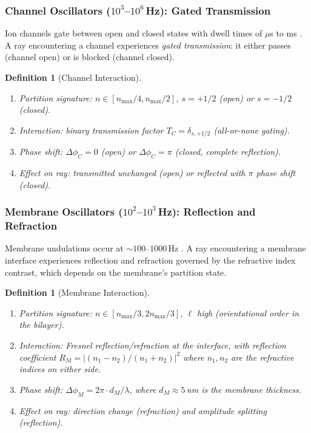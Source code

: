 \documentclass[11pt,twocolumn,a4paper]{article}
\newtheorem{definition}[theorem]{Definition}
\begin{document}
\subsubsection{Channel Oscillators ($10^{3}$--$10^{6}$\,Hz):
Gated Transmission}

Ion channels gate between open and closed states with dwell times of
$\mu$s to ms \citep{hille2001}. A ray encountering a channel
experiences \emph{gated transmission}: it either passes (channel open)
or is blocked (channel closed).

\begin{definition}[Channel Interaction]
\label{def:channel-interaction}
\begin{enumerate}[label=(\alph*),leftmargin=*]
\item \textit{Partition signature:} $n \in [n_{\max}/4, n_{\max}/2]$,
  $s = +1/2$ (open) or $s = -1/2$ (closed).
\item \textit{Interaction:} binary transmission factor
  $T_C = \delta_{s,+1/2}$ (all-or-none gating).
\item \textit{Phase shift:} $\Delta\phi_C = 0$ (open) or
  $\Delta\phi_C = \pi$ (closed, complete reflection).
\item \textit{Effect on ray:} transmitted unchanged (open) or
  reflected with $\pi$ phase shift (closed).
\end{enumerate}
\end{definition}

\subsubsection{Membrane Oscillators ($10^{2}$--$10^{3}$\,Hz):
Reflection and Refraction}

Membrane undulations occur at $\sim\!100$--$1000$\,Hz
\citep{singer1972}. A ray encountering a membrane interface
experiences reflection and refraction governed by the refractive index
contrast, which depends on the membrane's partition state.

\begin{definition}[Membrane Interaction]
\label{def:membrane-interaction}
\begin{enumerate}[label=(\alph*),leftmargin=*]
\item \textit{Partition signature:} $n \in [n_{\max}/3, 2n_{\max}/3]$,
  $\ell$ high (orientational order in the bilayer).
\item \textit{Interaction:} Fresnel reflection/refraction at the
  interface, with reflection coefficient $R_M = |(n_1 - n_2)/(n_1 +
  n_2)|^2$ where $n_1, n_2$ are the refractive indices on either side.
\item \textit{Phase shift:} $\Delta\phi_M = 2\pi \cdot d_M / \lambda$,
  where $d_M \approx 5$\,nm is the membrane thickness.
\item \textit{Effect on ray:} direction change (refraction) and
  amplitude splitting (reflection).
\end{enumerate}
\end{definition}
\end{document}
